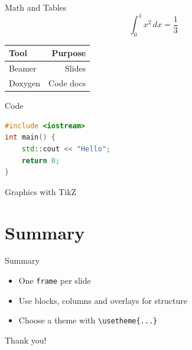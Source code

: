 \documentclass[aspectratio=169]{beamer}
\begin{document}
\begin{frame}{Math and Tables}
  \[ \int_0^1 x^2\,dx = \frac{1}{3} \]
  \begin{tabular}{lr}
    \toprule
    Tool & Purpose \\
    \midrule
    Beamer & Slides \\
    Doxygen & Code docs \\
    \bottomrule
  \end{tabular}
\end{frame}

\begin{frame}[fragile]{Code}
\begin{lstlisting}[language=C++]
#include <iostream>
int main() {
    std::cout << "Hello";
    return 0;
}
\end{lstlisting}
\end{frame}

\begin{frame}{Graphics with TikZ}
  \centering
\end{frame}

\section{Summary}
\begin{frame}{Summary}
  \begin{itemize}
    \item One \texttt{frame} per slide
    \item Use blocks, columns and overlays for structure
    \item Choose a theme with \texttt{\textbackslash usetheme\{...\}}
  \end{itemize}
  \centering \Large Thank you!
\end{frame}
\end{document}
